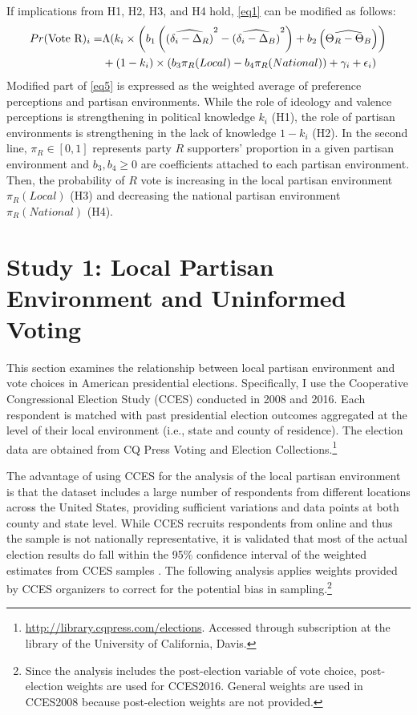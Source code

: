 \documentclass[letterpaper, 12pt]{article}
\begin{document}
    \par If implications from H1, H2, H3, and H4 hold, \autoref{eq1} can be modified as follows: 
    \begin{align}
        Pr(\text{Vote R})_i  =&  \Lambda( k_i \times \left( b_1\left(\widehat{(\delta_i-\Delta_{R})}^2 - \widehat{(\delta_i-\Delta_{B})}^2 \right) + b_2\left(\widehat{\Theta_{R} - \Theta_{B}}\right) \right) \notag \\
        &+ (1-k_i) \times \left( b_3\pi_R(Local) - b_4\pi_R(National)\right) + \gamma_i + \epsilon_i ) \label{eq5} 
    \end{align}
    \noindent Modified part of \autoref{eq5} is expressed as the weighted average of preference perceptions and partisan environments. While the role of ideology and valence perceptions is strengthening in political knowledge $k_i$ (H1), the role of partisan environments is strengthening in the lack of knowledge $1-k_i$ (H2). In the second line, $\pi_R \in [0,1]$ represents party $R$ supporters' proportion in a given partisan environment and $b_3, b_4 \geq 0$ are coefficients attached to each partisan environment. Then, the probability of $R$ vote is increasing in the local partisan environment $\pi_R(Local)$ (H3) and decreasing the national partisan environment $\pi_R(National)$ (H4).

    \section*{Study 1: Local Partisan Environment and Uninformed Voting}

    \par This section examines the relationship between local partisan environment and vote choices in American presidential elections. Specifically, I use the Cooperative Congressional Election Study (CCES) conducted in 2008 and 2016. Each respondent is matched with past presidential election outcomes aggregated at the level of their local environment (i.e., state and county of residence). The election data are obtained from CQ Press Voting and Election Collections.\footnote{\url{http://library.cqpress.com/elections}. Accessed through subscription at the library of the University of California, Davis.}
    
    \par The advantage of using CCES for the analysis of the local partisan environment is that the dataset includes a large number of respondents from different locations across the United States, providing sufficient variations and data points at both county and state level. While CCES recruits respondents from online and thus the sample is not nationally representative, it is validated that most of the actual election results do fall within the 95\% confidence interval of the weighted estimates from CCES samples \citep{Ansolabehere2011guto, Ansolabehere2017guto}. The following analysis applies weights provided by CCES organizers to correct for the potential bias in sampling.\footnote{Since the analysis includes the post-election variable of vote choice, post-election weights are used for CCES2016. General weights are used in CCES2008 because post-election weights are not provided.}
\end{document}
